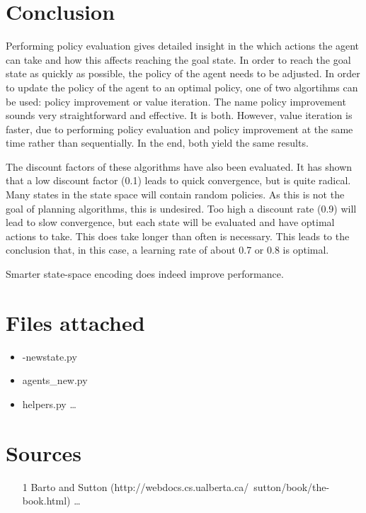 \documentclass{article}
\begin{document}
\section*{Conclusion}
Performing policy evaluation gives detailed insight in the which actions the agent can take and how this affects reaching the goal state. In order to reach the goal state as quickly as possible, the policy of the agent needs to be adjusted. In order to update the policy of the agent to an optimal policy, one of two algortihms can be used: policy improvement or value iteration. The name policy improvement sounds very straightforward and effective. It is both. However, value iteration is faster, due to performing policy evaluation and policy improvement at the same time rather than sequentially. In the end, both yield the same results.

The discount factors of these algorithms have also been evaluated. It has shown that a low discount factor (0.1) leads to quick convergence, but is quite radical. Many states in the state space will contain random policies. As this is not the goal of planning algorithms, this is undesired. Too high a discount rate (0.9) will lead to slow convergence, but each state will be evaluated and have optimal actions to take. This does take longer than often is necessary. This leads to the conclusion that, in this case, a learning rate of about 0.7 or 0.8 is optimal.

Smarter state-space encoding does indeed improve performance.



\section*{Files attached}
\begin{itemize}
\item -newstate.py
\item agents\_new.py
\item helpers.py \ldots
\end{itemize}
\section*{Sources}

\begin{itemize}
	\item [1] Barto and Sutton (http://webdocs.cs.ualberta.ca/~sutton/book/the-book.html) \ldots
\end{itemize}
\end{document}
